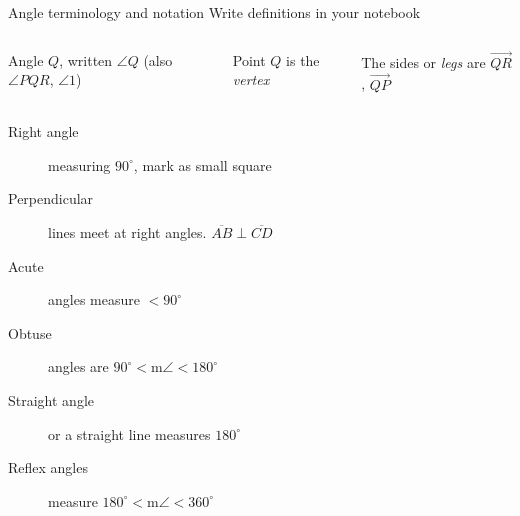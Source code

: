 \begin{frame}{Angle terminology and notation}
  {Write definitions in your notebook}
  \begin{columns}
    Angle $Q$, written $\angle Q$ (also $\angle PQR$, $\angle 1$) \par \medskip
    Point $Q$ is the \emph{vertex} \par \medskip
    The sides or \emph{legs} are $\overrightarrow{QR}$, $\overrightarrow{QP}$  \par \medskip
  \end{columns} \bigskip
  \begin{description}
    \item[Right angle] measuring $90^\circ$, mark as small square
    \item[Perpendicular] lines meet at right angles. $\overline{AB} \perp \overline{CD}$
    \item[Acute] angles measure $< 90^\circ$
    \item[Obtuse] angles are $90^\circ < \text{m}\angle < 180^\circ$
    \item[Straight angle] or a straight line  measures $180^\circ$
    \item[Reflex angles] measure $180^\circ < \text{m}\angle < 360^\circ$
  \end{description}
  \end{frame}

